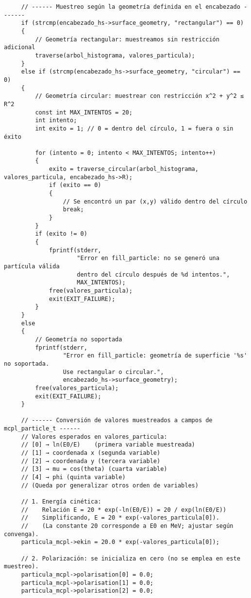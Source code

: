 \begin{verbatim}
     // ------ Muestreo según la geometría definida en el encabezado -------
     if (strcmp(encabezado_hs->surface_geometry, "rectangular") == 0)
     {
         // Geometría rectangular: muestreamos sin restricción adicional
         traverse(arbol_histograma, valores_particula);
     }
     else if (strcmp(encabezado_hs->surface_geometry, "circular") == 0)
     {
         // Geometría circular: muestrear con restricción x^2 + y^2 ≤ R^2
         const int MAX_INTENTOS = 20;
         int intento;
         int exito = 1; // 0 = dentro del círculo, 1 = fuera o sin éxito
 
         for (intento = 0; intento < MAX_INTENTOS; intento++)
         {
             exito = traverse_circular(arbol_histograma, valores_particula, encabezado_hs->R);
             if (exito == 0)
             {
                 // Se encontró un par (x,y) válido dentro del círculo
                 break;
             }
         }
         if (exito != 0)
         {
             fprintf(stderr,
                     "Error en fill_particle: no se generó una partícula válida 
                     dentro del círculo después de %d intentos.",
                     MAX_INTENTOS);
             free(valores_particula);
             exit(EXIT_FAILURE);
         }
     }
     else
     {
         // Geometría no soportada
         fprintf(stderr,
                 "Error en fill_particle: geometría de superficie '%s' no soportada. 
                 Use rectangular o circular.",
                 encabezado_hs->surface_geometry);
         free(valores_particula);
         exit(EXIT_FAILURE);
     }
 
     // ------ Conversión de valores muestreados a campos de mcpl_particle_t ------
     // Valores esperados en valores_particula:
     // [0] → ln(E0/E)    (primera variable muestreada)
     // [1] → coordenada x (segunda variable)
     // [2] → coordenada y (tercera variable)
     // [3] → mu = cos(theta) (cuarta variable)
     // [4] → phi (quinta variable)
     // (Queda por generalizar otros orden de variables)
 
     // 1. Energía cinética:
     //    Relación E = 20 * exp(-ln(E0/E)) = 20 / exp(ln(E0/E))
     //    Simplificando, E = 20 * exp(-valores_particula[0]).
     //    (La constante 20 corresponde a E0 en MeV; ajustar según convenga).
     particula_mcpl->ekin = 20.0 * exp(-valores_particula[0]);
 
     // 2. Polarización: se inicializa en cero (no se emplea en este muestreo).
     particula_mcpl->polarisation[0] = 0.0;
     particula_mcpl->polarisation[1] = 0.0;
     particula_mcpl->polarisation[2] = 0.0;
 

\end{verbatim}
